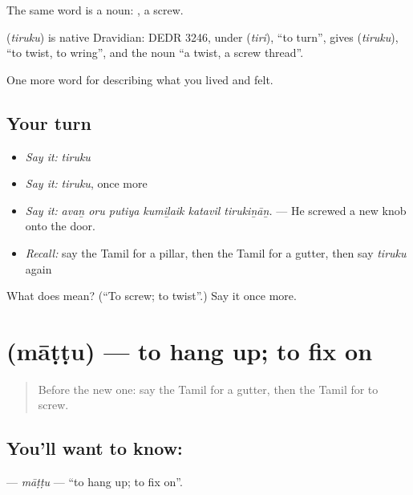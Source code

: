 The same word is a noun:  , a screw.

\begin{cousinweb}
\textbf{} (\emph{tiruku}) is native Dravidian: DEDR 3246, under  (\emph{tiri}), \textquotedblleft{}to turn\textquotedblright{}, gives  (\emph{tiruku}), \textquotedblleft{}to twist, to wring\textquotedblright{}, and the noun \textquotedblleft{}a twist, a screw thread\textquotedblright{}.
\end{cousinweb}

\begin{grammarlens}[title={What you've built}]
One more word for describing what you lived and felt.
\end{grammarlens}

\subsection*{Your turn}
\begin{itemize}
\raggedright
  \item \emph{Say it:} \emph{tiruku}
  \item \emph{Say it:} \emph{tiruku}, once more
  \item \emph{Say it:} \emph{avaṉ oru putiya kumiḻaik katavil tirukiṉāṉ.} — He screwed a new knob onto the door.
  \item \emph{Recall:} say the Tamil for a pillar, then the Tamil for a gutter, then say \emph{tiruku} again
\end{itemize}

\begin{tcolorbox}[breakable,colback=teal!4,colframe=teal!35!black,title={Before you move on}]
What does  mean? (\textquotedblleft{}To screw; to twist\textquotedblright{}.) Say it once more.
\end{tcolorbox}
\section[\texorpdfstring{\ta{மாட்டு} (māṭṭu)}{மாட்டு (māṭṭu)}]{ (māṭṭu) — to hang up; to fix on}

\label{lesson:TA-C523-mattu}



\begin{quote}
Before the new one: say the Tamil for a gutter, then the Tamil for to screw.
\end{quote}

\subsection*{You'll want to know: }
\textbf{} — \emph{māṭṭu} — \textquotedblleft{}to hang up; to fix on\textquotedblright{}.

